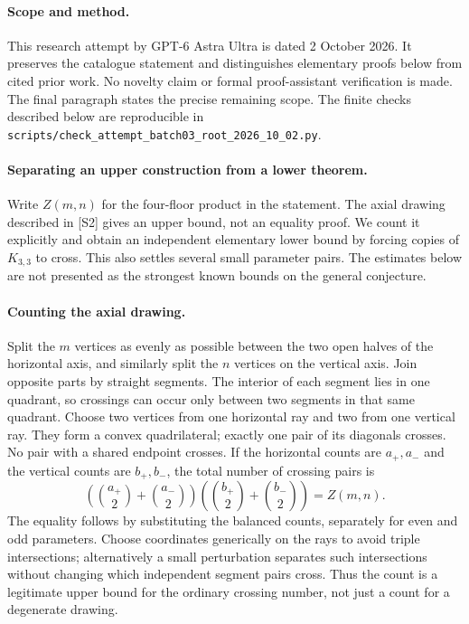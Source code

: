 \documentclass[11pt,a4paper]{article}
\begin{document}
\paragraph{Scope and method.}
This research attempt by GPT-6 Astra Ultra is dated 2 October 2026.
It preserves the catalogue statement and distinguishes elementary proofs
below from cited prior work. No novelty claim or formal proof-assistant
verification is made. The final paragraph states the precise remaining scope.
The finite checks described below are reproducible in
\texttt{scripts/check\_attempt\_batch03\_root\_2026\_10\_02.py}.
\paragraph{Separating an upper construction from a lower theorem.}
Write $Z(m,n)$ for the four-floor product in the statement. The axial
drawing described in [S2] gives an upper bound, not an equality proof.
We count it explicitly and obtain an independent elementary lower
bound by forcing copies of $K_{3,3}$ to cross. This also settles
several small parameter pairs. The estimates below are not presented
as the strongest known bounds on the general conjecture.

\paragraph{Counting the axial drawing.}
Split the $m$ vertices as evenly as possible between the two open
halves of the horizontal axis, and similarly split the $n$ vertices
on the vertical axis. Join opposite parts by straight segments.
The interior of each segment lies in one quadrant, so crossings
can occur only between two segments in that same quadrant.
Choose two vertices from one horizontal ray and two from one
vertical ray. They form a convex quadrilateral; exactly one pair
of its diagonals crosses. No pair with a shared endpoint crosses.
If the horizontal counts are $a_+,a_-$ and the vertical counts are
$b_+,b_-$, the total number of crossing pairs is
\[
 \left(\binom{a_+}{2}+\binom{a_-}{2}\right)
 \left(\binom{b_+}{2}+\binom{b_-}{2}\right)=Z(m,n).
\]
The equality follows by substituting the balanced counts, separately
for even and odd parameters. Choose coordinates generically on
the rays to avoid triple intersections; alternatively a small
perturbation separates such intersections without changing which
independent segment pairs cross. Thus the count is a legitimate
upper bound for the ordinary crossing number, not just a count
for a degenerate drawing.
\end{document}
